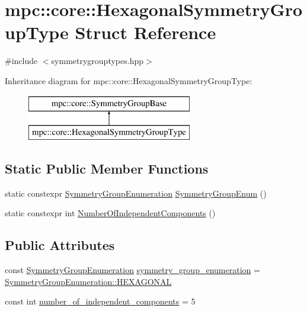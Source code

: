 \hypertarget{structmpc_1_1core_1_1_hexagonal_symmetry_group_type}{}\section{mpc\+:\+:core\+:\+:Hexagonal\+Symmetry\+Group\+Type Struct Reference}
\label{structmpc_1_1core_1_1_hexagonal_symmetry_group_type}


{\ttfamily \#include $<$symmetrygrouptypes.\+hpp$>$}

Inheritance diagram for mpc\+:\+:core\+:\+:Hexagonal\+Symmetry\+Group\+Type\+:\begin{figure}[H]
\begin{center}
\leavevmode
\includegraphics[height=2.000000cm]{structmpc_1_1core_1_1_hexagonal_symmetry_group_type}
\end{center}
\end{figure}
\subsection*{Static Public Member Functions}
\begin{DoxyCompactItemize}
\item 
static constexpr \mbox{\hyperlink{namespacempc_1_1core_a9d979684062547055a0ef5c13077bad8}{Symmetry\+Group\+Enumeration}} \mbox{\hyperlink{structmpc_1_1core_1_1_hexagonal_symmetry_group_type_a8cea833b34367fcff5f6b485f05021f3}{Symmetry\+Group\+Enum}} ()
\item 
static constexpr int \mbox{\hyperlink{structmpc_1_1core_1_1_hexagonal_symmetry_group_type_a04e0cc053d16f003808c9232cef6a7ac}{Number\+Of\+Independent\+Components}} ()
\end{DoxyCompactItemize}
\subsection*{Public Attributes}
\begin{DoxyCompactItemize}
\item 
const \mbox{\hyperlink{namespacempc_1_1core_a9d979684062547055a0ef5c13077bad8}{Symmetry\+Group\+Enumeration}} \mbox{\hyperlink{structmpc_1_1core_1_1_hexagonal_symmetry_group_type_a953ee47f7c2eb028edcf3c994565df8d}{symmetry\+\_\+group\+\_\+enumeration}} = \mbox{\hyperlink{namespacempc_1_1core_a9d979684062547055a0ef5c13077bad8a5d7adeeaa10073a6a3c5bd970a7f958b}{Symmetry\+Group\+Enumeration\+::\+H\+E\+X\+A\+G\+O\+N\+AL}}
\item 
const int \mbox{\hyperlink{structmpc_1_1core_1_1_hexagonal_symmetry_group_type_aee537d24b7cc35758c30708c58528f21}{number\+\_\+of\+\_\+independent\+\_\+components}} = 5
\end{DoxyCompactItemize}


